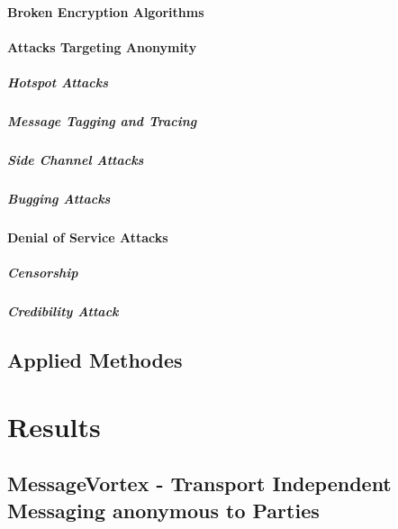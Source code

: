 \subsection{Broken Encryption Algorithms}
\subsection{Attacks Targeting Anonymity}
\subsubsection{Hotspot Attacks}
\subsubsection{Message Tagging and Tracing}
\subsubsection{Side Channel Attacks}

\subsubsection{Bugging Attacks}

\subsection{Denial of Service Attacks}
\subsubsection{Censorship}
\subsubsection{Credibility Attack}

\chapter{Applied Methodes}

\part{Results}

\chapter{MessageVortex - Transport Independent Messaging anonymous to  Parties}
